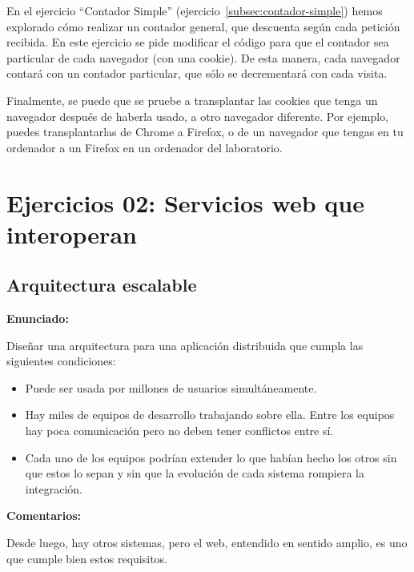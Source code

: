 En el ejercicio ``Contador Simple'' (ejercicio~\ref{subsec:contador-simple}) hemos explorado cómo realizar un contador general, que descuenta según cada petición recibida. En este ejercicio se pide modificar el código para que el contador sea particular de cada navegador (con una cookie). De esta manera, cada navegador contará con un contador particular, que sólo se decrementará con cada visita.

Finalmente, se puede que se pruebe a transplantar las cookies que tenga un navegador después de haberla usado, a otro navegador diferente. Por ejemplo, puedes transplantarlas de Chrome a Firefox, o de un navegador que tengas en tu ordenador a un Firefox en un ordenador del laboratorio.


\section{Ejercicios 02: Servicios web que interoperan}


\subsection{Arquitectura escalable}
\label{subsec:arq-escalable}

\textbf{Enunciado:}

Diseñar una arquitectura para una aplicación distribuida que cumpla las siguientes condiciones:

\begin{itemize}
\item Puede ser usada por millones de usuarios simultáneamente.
\item Hay miles de equipos de desarrollo trabajando sobre ella. Entre los equipos hay poca comunicación pero no deben tener conflictos entre sí.
\item Cada uno de los equipos podrían extender lo que habían hecho los otros sin que estos lo sepan y sin que la evolución de cada sistema rompiera la integración.
\end{itemize}

\textbf{Comentarios:}

Desde luego, hay otros sistemas, pero el web, entendido en sentido amplio, es uno que cumple bien estos requisitos.


